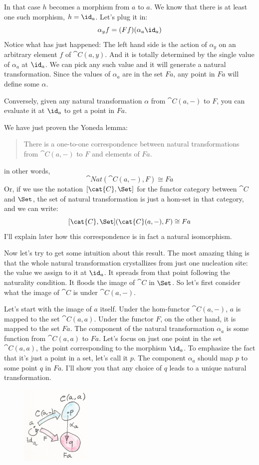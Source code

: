 \noindent
In that case $h$ becomes a morphism from $a$ to
$a$. We know that there is at least one such morphism,
$h = \id_a$. Let's plug it in:
\[\alpha_y f = (F f) (\alpha_a \id_a)\]
Notice what has just happened: The left hand side is the action of
$\alpha_y$ on an arbitrary element $f$ of $\cat{C}(a, y)$. And
it is totally determined by the single value of $\alpha_a$ at
$\id_a$. We can pick any such value and it will generate a natural
transformation. Since the values of $\alpha_a$ are in the set
$F a$, any point in $F a$ will define some $\alpha$.

Conversely, given any natural transformation $\alpha$ from
$\cat{C}(a, -)$ to $F$, you can evaluate it at $\id_a$ to
get a point in $F a$.

We have just proven the Yoneda lemma:

\begin{quote}
There is a one-to-one correspondence between natural transformations
from $\cat{C}(a, -)$ to $F$ and elements of $F a$. 
\end{quote}
in other words,
\[\cat{Nat}(\cat{C}(a, -), F) \cong F a\]
Or, if we use the notation $[\cat{C}, \Set]$ for the functor
category between $\cat{C}$ and $\Set$, the set of natural
transformation is just a hom-set in that category, and we can write:
\[[\cat{C}, \Set](\cat{C}(a, -), F) \cong F a\]
I'll explain later how this correspondence is in fact a natural
isomorphism.

Now let's try to get some intuition about this result. The most amazing
thing is that the whole natural transformation crystallizes from just
one nucleation site: the value we assign to it at $\id_a$. It
spreads from that point following the naturality condition. It floods
the image of $\cat{C}$ in $\Set$. So let's first consider what the
image of $\cat{C}$ is under $\cat{C}(a, -)$.

Let's start with the image of $a$ itself. Under the hom-functor
$\cat{C}(a, -)$, $a$ is mapped to the set $\cat{C}(a, a)$.
Under the functor $F$, on the other hand, it is mapped to the set
$F a$. The component of the natural transformation $\alpha_a$
is some function from $\cat{C}(a, a)$ to $F a$. Let's focus on
just one point in the set $\cat{C}(a, a)$, the point corresponding to
the morphism $\id_a$. To emphasize the fact that it's just a point
in a set, let's call it $p$. The component $\alpha_a$ should map
$p$ to some point $q$ in $F a$. I'll show you that
any choice of $q$ leads to a unique natural transformation.

\begin{figure}[H]
\centering
\includegraphics[width=0.3\textwidth]{images/yoneda3.png}
\end{figure}

